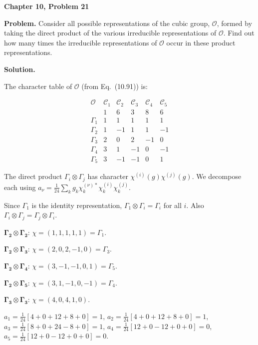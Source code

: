 \documentclass[12pt]{article}
\begin{document}
\begin{center}
{\Large\bfseries Chapter 10, Problem 21}
\end{center}

\noindent\textbf{Problem.} Consider all possible representations of the cubic group, $\mathscr{O}$, formed by taking the direct product of the various irreducible representations of $\mathscr{O}$. Find out how many times the irreducible representations of $\mathscr{O}$ occur in these product representations.

\bigskip
\noindent\textbf{Solution.}

The character table of $\mathscr{O}$ (from Eq.~(10.91)) is:

\[
\begin{array}{c|ccccc}
\mathscr{O} & \mathcal{C}_1 & \mathcal{C}_2 & \mathcal{C}_3 & \mathcal{C}_4 & \mathcal{C}_5 \\
& 1 & 6 & 3 & 8 & 6 \\
\hline
\Gamma_1 & 1 & 1 & 1 & 1 & 1 \\
\Gamma_2 & 1 & -1 & 1 & 1 & -1 \\
\Gamma_3 & 2 & 0 & 2 & -1 & 0 \\
\Gamma_4 & 3 & 1 & -1 & 0 & -1 \\
\Gamma_5 & 3 & -1 & -1 & 0 & 1
\end{array}
\]

The direct product $\Gamma_i \otimes \Gamma_j$ has character $\chi^{(i)}(g)\chi^{(j)}(g)$. We decompose each using $a_\nu = \frac{1}{24}\sum_k g_k \chi^{(\nu)*}_k \chi^{(i)}_k \chi^{(j)}_k$.

Since $\Gamma_1$ is the identity representation, $\Gamma_1 \otimes \Gamma_i = \Gamma_i$ for all $i$. Also $\Gamma_i \otimes \Gamma_j = \Gamma_j \otimes \Gamma_i$.

\medskip
\noindent$\boldsymbol{\Gamma_2 \otimes \Gamma_2}$: $\chi = (1, 1, 1, 1, 1) = \Gamma_1$.

\noindent$\boldsymbol{\Gamma_2 \otimes \Gamma_3}$: $\chi = (2, 0, 2, -1, 0) = \Gamma_3$.

\noindent$\boldsymbol{\Gamma_2 \otimes \Gamma_4}$: $\chi = (3, -1, -1, 0, 1) = \Gamma_5$.

\noindent$\boldsymbol{\Gamma_2 \otimes \Gamma_5}$: $\chi = (3, 1, -1, 0, -1) = \Gamma_4$.

\medskip
\noindent$\boldsymbol{\Gamma_3 \otimes \Gamma_3}$: $\chi = (4, 0, 4, 1, 0)$.

$a_1 = \frac{1}{24}[4 + 0 + 12 + 8 + 0] = 1$, $a_2 = \frac{1}{24}[4 + 0 + 12 + 8 + 0] = 1$, $a_3 = \frac{1}{24}[8 + 0 + 24 - 8 + 0] = 1$, $a_4 = \frac{1}{24}[12 + 0 - 12 + 0 + 0] = 0$, $a_5 = \frac{1}{24}[12 + 0 - 12 + 0 + 0] = 0$.
\end{document}
